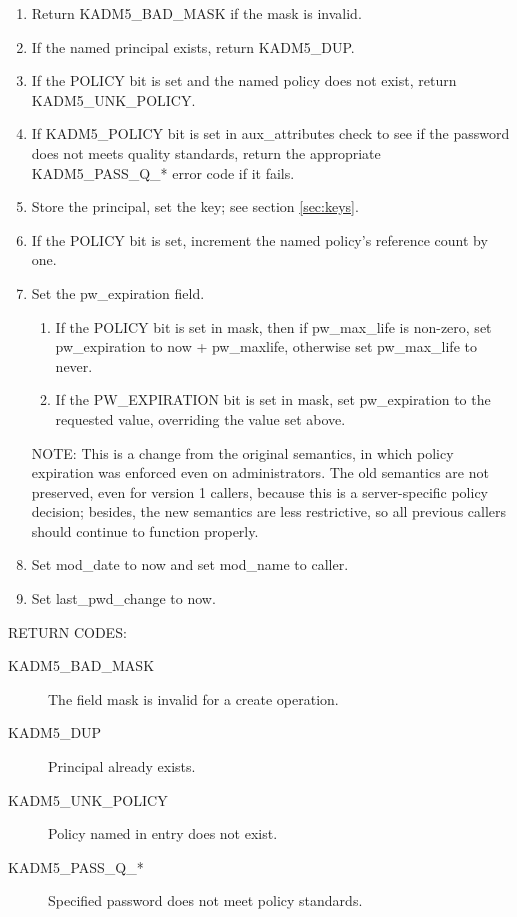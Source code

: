 \begin{enumerate}

\item Return KADM5_BAD_MASK if the mask is invalid.
\item If the named principal exists, return KADM5_DUP.
\item If the POLICY bit is set and the named policy does not exist,
return KADM5_UNK_POLICY.
\item If KADM5_POLICY bit is set in aux_attributes check to see if
the password does not meets quality standards, return the appropriate
KADM5_PASS_Q_* error code if it fails.
\item Store the principal, set the key; see section \ref{sec:keys}.
\item If the POLICY bit is set, increment the named policy's reference
count by one.

\item Set the pw_expiration field.
\begin{enumerate}
\item If the POLICY bit is set in mask, then if pw_max_life is non-zero,
set pw_expiration to now + pw_maxlife, otherwise set pw_max_life to
never.
\item If the PW_EXPIRATION bit is set in mask, set pw_expiration to
the requested value, overriding the value set above.
\end{enumerate}
NOTE: This is a change from the original semantics, in which policy
expiration was enforced even on administrators.  The old semantics are
not preserved, even for version 1 callers, because this is a
server-specific policy decision; besides, the new semantics are less
restrictive, so all previous callers should continue to function
properly.

\item Set mod_date to now and set mod_name to caller.
\item Set last_pwd_change to now.
\end{enumerate}

RETURN CODES:

\begin{description}
\item[KADM5_BAD_MASK] The field mask is invalid for a create
operation.
\item[KADM5_DUP] Principal already exists.
\item[KADM5_UNK_POLICY] Policy named in entry does not exist.
\item[KADM5_PASS_Q_*] Specified password does not meet policy
standards.
\end{description}

